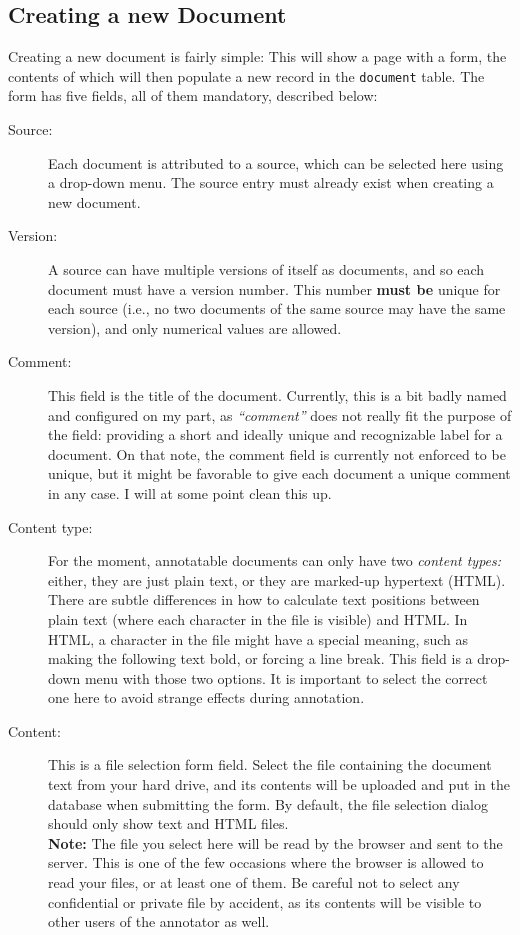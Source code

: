 \subsection{Creating a new Document}
\label{sec:document-creation}

Creating a new document is fairly simple:
This will show a page with a form, the contents of which will then populate a new record in the \verb!document! table.
The form has five fields, all of them mandatory, described below:

\begin{description}
  \item[Source:]
    Each document is attributed to a source, which can be selected here using a drop-down menu.
    The source entry must already exist when creating a new document.

  \item[Version:]
    A source can have multiple versions of itself as documents, and so each document must have a version number.
    This number \textbf{must be} unique for each source (i.e., no two documents of the same source may have the same version), and only numerical values are allowed.

  \item[Comment:]
    This field is the title of the document.
    Currently, this is a bit badly named and configured on my part, as \emph{\enquote{comment}} does not really fit the purpose of the field: providing a short and ideally unique and recognizable label for a document.
    On that note, the comment field is currently not enforced to be unique, but it might be favorable to give each document a unique comment in any case.
    I will at some point clean this up.

  \item[Content type:]
    For the moment, annotatable documents can only have two \emph{content types:}
    either, they are just plain text, or they are marked-up hypertext (HTML).
    There are subtle differences in how to calculate text positions between plain text (where each character in the file is visible) and HTML.
    In HTML, a character in the file might have a special meaning, such as making the following text bold, or forcing a line break.
    This field is a drop-down menu with those two options.
    It is important to select the correct one here to avoid strange effects during annotation.

  \item[Content:]
    This is a file selection form field.
    Select the file containing the document text from your hard drive, and its contents will be uploaded and put in the database when submitting the form.
    By default, the file selection dialog should only show text and HTML files.\\
    \textbf{Note:} The file you select here will be read by the browser and sent to the server.
    This is one of the few occasions where the browser is allowed to read your files, or at least one of them.
    Be careful not to select any confidential or private file by accident, as its contents will be visible to other users of the annotator as well.
\end{description}


